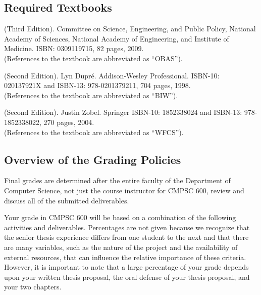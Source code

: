 \vspace{-.15in}
\subsection*{Required Textbooks}
\vspace{-.05in}

 (Third Edition).  Committee on Science,
Engineering, and Public Policy, National Academy of Sciences, National Academy of Engineering, and Institute of
Medicine. ISBN: 0309119715, 82 pages, 2009.\\ (References to the textbook are abbreviated as ``OBAS'').

 (Second Edition). Lyn Dupr\'e.  Addison-Wesley
Professional.  ISBN-10: 020137921X and ISBN-13: 978-0201379211, 704 pages, 1998.\\ (References to the textbook are
abbreviated as ``BIW'').

 (Second Edition).  Justin Zobel.  Springer ISBN-10: 1852338024 and ISBN-13:
978-1852338022, 270 pages, 2004. \\ (References to the textbook are abbreviated as ``WFCS'').

\vspace*{-.15in}
\subsection*{Overview of the Grading Policies}

Final grades are determined after the entire faculty of the Department of Computer Science, not just the course
instructor for CMPSC 600, review and discuss all of the submitted deliverables.

Your grade in CMPSC 600 will be based on a combination of the following activities and deliverables. Percentages are not
given because we recognize that the senior thesis experience differs from one student to the next and that there are many
variables, such as the nature of the project and the availability of external resources, that can influence the relative
importance of these criteria. However, it is important to note that a large percentage of your grade depends upon your
written thesis proposal, the oral defense of your thesis proposal, and your two chapters.

\vspace*{-.05in}

